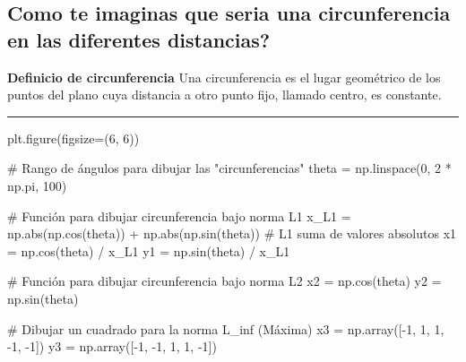 \documentclass[
  letterpaper,
  DIV=11,
  numbers=noendperiod]{scrartcl}
\newenvironment{Shaded}{\begin{snugshade}}{\end{snugshade}}
\newcommand{\BuiltInTok}[1]{\textcolor[rgb]{0.00,0.23,0.31}{#1}}
\newcommand{\CommentTok}[1]{\textcolor[rgb]{0.37,0.37,0.37}{#1}}
\newcommand{\DecValTok}[1]{\textcolor[rgb]{0.68,0.00,0.00}{#1}}
\newcommand{\NormalTok}[1]{\textcolor[rgb]{0.00,0.23,0.31}{#1}}
\newcommand{\OperatorTok}[1]{\textcolor[rgb]{0.37,0.37,0.37}{#1}}
\begin{document}
\subsection{Como te imaginas que seria una circunferencia en las
diferentes
distancias?}\label{como-te-imaginas-que-seria-una-circunferencia-en-las-diferentes-distancias}

\textbf{Definicio de circunferencia} Una circunferencia es el lugar
geométrico de los puntos del plano cuya distancia a otro punto fijo,
llamado centro, es constante.

\begin{center}\rule{0.5\linewidth}{0.5pt}\end{center}

\begin{Shaded}
\begin{Highlighting}[]
\NormalTok{plt.figure(figsize}\OperatorTok{=}\NormalTok{(}\DecValTok{6}\NormalTok{, }\DecValTok{6}\NormalTok{))}

\CommentTok{\# Rango de ángulos para dibujar las "circunferencias"}
\NormalTok{theta }\OperatorTok{=}\NormalTok{ np.linspace(}\DecValTok{0}\NormalTok{, }\DecValTok{2} \OperatorTok{*}\NormalTok{ np.pi, }\DecValTok{100}\NormalTok{)}

\CommentTok{\# Función para dibujar circunferencia bajo norma L1}
\NormalTok{x\_L1 }\OperatorTok{=}\NormalTok{ np.}\BuiltInTok{abs}\NormalTok{(np.cos(theta)) }\OperatorTok{+}\NormalTok{ np.}\BuiltInTok{abs}\NormalTok{(np.sin(theta))  }\CommentTok{\# L1 suma de valores absolutos}
\NormalTok{x1 }\OperatorTok{=}\NormalTok{ np.cos(theta) }\OperatorTok{/}\NormalTok{ x\_L1}
\NormalTok{y1 }\OperatorTok{=}\NormalTok{ np.sin(theta) }\OperatorTok{/}\NormalTok{ x\_L1}

\CommentTok{\# Función para dibujar circunferencia bajo norma L2}
\NormalTok{x2 }\OperatorTok{=}\NormalTok{ np.cos(theta)}
\NormalTok{y2 }\OperatorTok{=}\NormalTok{ np.sin(theta)}

\CommentTok{\# Dibujar un cuadrado para la norma L\_inf (Máxima)}
\NormalTok{x3 }\OperatorTok{=}\NormalTok{ np.array([}\OperatorTok{{-}}\DecValTok{1}\NormalTok{, }\DecValTok{1}\NormalTok{, }\DecValTok{1}\NormalTok{, }\OperatorTok{{-}}\DecValTok{1}\NormalTok{, }\OperatorTok{{-}}\DecValTok{1}\NormalTok{])}
\NormalTok{y3 }\OperatorTok{=}\NormalTok{ np.array([}\OperatorTok{{-}}\DecValTok{1}\NormalTok{, }\OperatorTok{{-}}\DecValTok{1}\NormalTok{, }\DecValTok{1}\NormalTok{, }\DecValTok{1}\NormalTok{, }\OperatorTok{{-}}\DecValTok{1}\NormalTok{])}


\end{Highlighting}
\end{Shaded}
\end{document}
